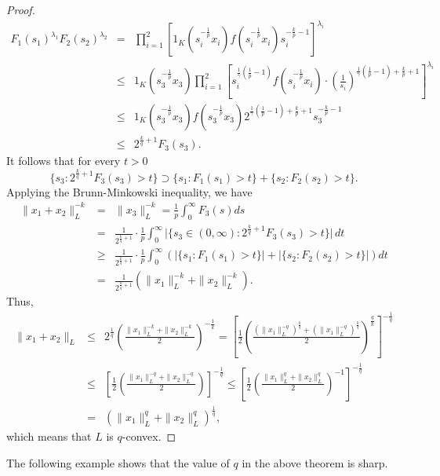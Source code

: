 \documentclass[12pt]{amsart} %
\renewcommand{\[}{\left[}
\renewcommand{\(}{\left(}
\renewcommand{\]}{\right]}
\renewcommand{\)}{\right)}
\renewcommand{\le}{\leqslant}
\renewcommand{\ge}{\geqslant}
\newcommand{\ga}{\gamma}
\newcommand{\la}{\lambda}
\begin{document}
\begin{proof}
\begin{eqnarray*}
F_1(s_1)^{\la_1} F_2(s_2)^{\la_2}
&=& \prod_{i=1}^2 \[1_K(s_i^{-\frac 1p}x_i) f(s_i^{-\frac 1p}x_i)s_i^{-\frac kp-1} \]^{\la_i} \\
&\le& 1_K(s_3^{-\frac 1p}x_3) \prod_{i=1}^2 \[ s_i^{\frac 1\ga(\frac 1p-1)}
f(s_i^{-\frac 1p}x_i) \cdot \(\frac{1}{s_i}\)^{\frac 1\ga (\frac 1p-1) + \frac kp+1}\]^{\la_i} \\
&\le& 1_K(s_3^{-\frac 1p}x_3) f(s_3^{-\frac 1p}x_3)
2^{\frac 1\ga (\frac 1p-1)+\frac kp+1} s_3^{-\frac kp-1} \\
&\le& 2^{\frac kq +1} F_3(s_3).
\end{eqnarray*}
It follows that for every $t>0$
$$
\{s_3 : 2^{\frac kq +1} F_3(s_3)>t\}  \supset \{s_1 : F_1(s_1)>t\}+ \{s_2 : F_2(s_2)>t\}.
$$
Applying the Brunn-Minkowski inequality, we have
\begin{eqnarray*}
\|x_1+x_2\|_L^{-k} &=& \|x_3\|_L^{-k} = \frac 1p\int_0^\infty F_3(s)ds \\
&=& \frac{1}{2^{\frac kq +1}} \cdot \frac 1p\int_0^\infty \Big|\{s_3 \in
(0,\infty) : 2^{\frac kq +1}F_3(s_3)>t\}\Big|\, dt \\
&\ge& \frac{1}{2^{\frac kq+1}} \cdot \frac 1p\int_0^\infty
\(\Big|\{s_1 : F_1(s_1)>t\}\Big| + \Big|\{s_2 :F_2(s_2)>t\}\Big| \) dt \\
&=& \frac{1}{2^{\frac kq+1}} (\|x_1\|_L^{-k} + \|x_2\|_L^{-k}).
\end{eqnarray*}
Thus,
\begin{eqnarray*}
\|x_1+x_2\|_L &\le& 2^{\frac 1q} \(\frac{\|x_1\|_L^{-k} + \|x_2\|_L^{-k}}{2}\)^{-\frac 1k}
= \[ \frac 12 \( \frac{(\|x_1\|_L^{-q})^{\frac kq} + (\|x_1\|_L^{-q})^{\frac kq}}{2} \)^{\frac qk}\]^{-\frac 1q} \\
&\le& \[ \frac 12 \( \frac{\|x_1\|_L^{-q} + \|x_2\|_L^{-q} }{2} \)
\]^{-\frac 1q}
\le \[ \frac 12 \( \frac{\|x_1\|_L^q + \|x_2\|_L^q}{2} \)^{-1} \]^{-\frac 1q}\\
&=& \( \|x_1\|_L^q + \|x_2\|_L^q \)^{\frac 1q},
\end{eqnarray*}
which means that $L$ is $q$-convex.

\end{proof}

The following example shows that the value of $q$ in the above theorem is sharp.\\
\end{document}
